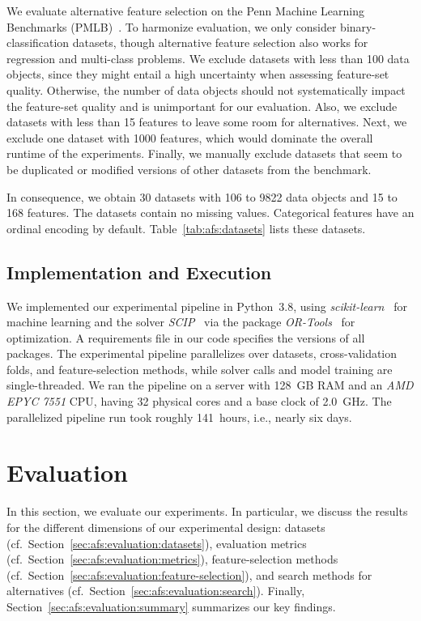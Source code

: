 \documentclass{article}
\theoremstyle{definition}
\begin{document}
We evaluate alternative feature selection on the Penn Machine Learning Benchmarks (PMLB)~\cite{olson2017pmlb,romano2021pmlb}.
To harmonize evaluation, we only consider binary-classification datasets, though alternative feature selection also works for regression and multi-class problems.
We exclude datasets with less than 100 data objects, since they might entail a high uncertainty when assessing feature-set quality.
Otherwise, the number of data objects should not systematically impact the feature-set quality and is unimportant for our evaluation.
Also, we exclude datasets with less than 15 features to leave some room for alternatives.
Next, we exclude one dataset with 1000 features, which would dominate the overall runtime of the experiments.
Finally, we manually exclude datasets that seem to be duplicated or modified versions of other datasets from the benchmark.

In consequence, we obtain 30 datasets with 106 to 9822 data objects and 15 to 168 features.
The datasets contain no missing values.
Categorical features have an ordinal encoding by default.
Table~\ref{tab:afs:datasets} lists these datasets.

\subsection{Implementation and Execution}
\label{sec:afs:experimental-design:implementation}

We implemented our experimental pipeline in Python~3.8, using \emph{scikit-learn}~\cite{pedregosa2011scikit-learn} for machine learning and the solver \emph{SCIP}~\cite{bestuzheva2021scip} via the package \emph{OR-Tools}~\cite{perron2022or-tools} for optimization.
A requirements file in our code specifies the versions of all packages.
The experimental pipeline parallelizes over datasets, cross-validation folds, and feature-selection methods, while solver calls and model training are single-threaded.
We ran the pipeline on a server with 128~GB RAM and an \emph{AMD EPYC 7551} CPU, having 32 physical cores and a base clock of 2.0~GHz.
The parallelized pipeline run took roughly 141~hours, i.e., nearly six days.

\section{Evaluation}
\label{sec:afs:evaluation}

In this section, we evaluate our experiments.
In particular, we discuss the results for the different dimensions of our experimental design:
datasets (cf.~Section~\ref{sec:afs:evaluation:datasets}), evaluation metrics (cf.~Section~\ref{sec:afs:evaluation:metrics}), feature-selection methods (cf.~Section~\ref{sec:afs:evaluation:feature-selection}), and search methods for alternatives (cf.~Section~\ref{sec:afs:evaluation:search}).
Finally, Section~\ref{sec:afs:evaluation:summary} summarizes our key findings.
\end{document}
